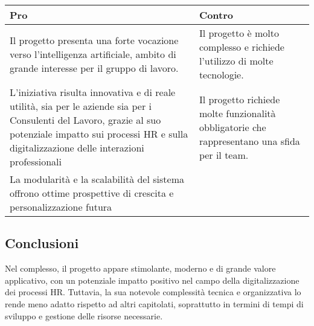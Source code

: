 \documentclass[a4paper,12pt]{article}
\begin{document}
{{        \begin{center} 
            \begin{tabular}{|p{10cm}|p{5cm}|}
                \hline
                \textbf{Pro} & \textbf{Contro} \\
                \hline
                Il progetto presenta una forte vocazione verso l'intelligenza artificiale, ambito di grande interesse per il gruppo di lavoro. & Il progetto è molto complesso e richiede l'utilizzo di molte tecnologie. \\
                \hline
                L'iniziativa risulta innovativa e di reale utilità, sia per le aziende sia per i Consulenti del Lavoro, grazie al suo potenziale impatto sui processi HR e sulla digitalizzazione delle interazioni professionali & Il progetto richiede molte funzionalità obbligatorie che rappresentano una sfida per il team. \\
                \hline
                La modularità e la scalabilità del sistema offrono ottime prospettive di crescita e personalizzazione futura & \\
                \hline
            \end{tabular}
        \end{center}

    }

    \subsection*{Conclusioni}{
        Nel complesso, il progetto appare stimolante, moderno e di grande valore applicativo, con un potenziale impatto positivo nel campo della digitalizzazione dei processi HR. Tuttavia, la sua notevole complessità tecnica e organizzativa lo rende meno adatto rispetto ad altri capitolati, soprattutto in termini di tempi di sviluppo e gestione delle risorse necessarie.
    }
}

\newpage
\end{document}
